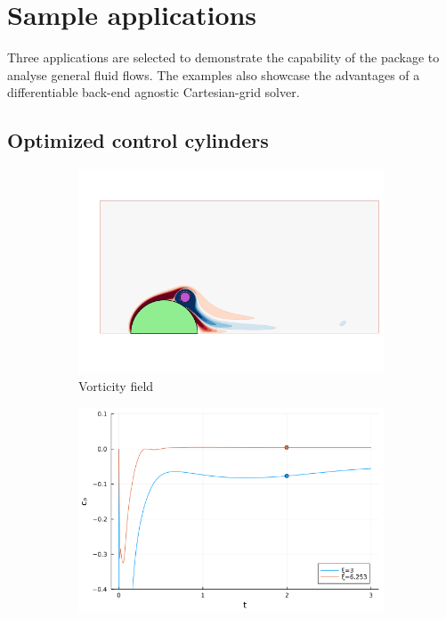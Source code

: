\documentclass[final,3p,times]{elsarticle}
\begin{document}
\section{Sample applications}\label{sec:applications}
Three applications are selected to demonstrate the capability of the package to analyse general fluid flows. The examples also showcase the advantages of a differentiable back-end agnostic Cartesian-grid solver.

\subsection{Optimized control cylinders}

\begin{figure}
    \centering
    \begin{subfigure}[t]{0.9\linewidth}
        \centering
        \includegraphics[width=\linewidth,trim={50 70 20 200},clip]{img/SpinCylFlood.png}
        \caption{Vorticity field}
    \end{subfigure}
    \begin{subfigure}[b]{0.45\linewidth}
        \includegraphics[width=\linewidth]{img/SpinCylHist.png}

\end{subfigure}
\end{figure}
\end{document}
